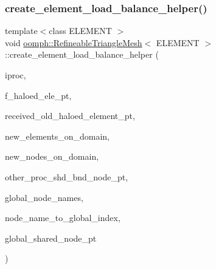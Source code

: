 \subsubsection{\texorpdfstring{create\+\_\+element\+\_\+load\+\_\+balance\+\_\+helper()}{create\_element\_load\_balance\_helper()}}
{\footnotesize\ttfamily template$<$class E\+L\+E\+M\+E\+NT $>$ \\
void \hyperlink{classoomph_1_1RefineableTriangleMesh}{oomph\+::\+Refineable\+Triangle\+Mesh}$<$ E\+L\+E\+M\+E\+NT $>$\+::create\+\_\+element\+\_\+load\+\_\+balance\+\_\+helper (\begin{DoxyParamCaption}\item[{unsigned \&}]{iproc,  }\item[{\hyperlink{classoomph_1_1Vector}{Vector}$<$ \hyperlink{classoomph_1_1Vector}{Vector}$<$ \hyperlink{classoomph_1_1FiniteElement}{Finite\+Element} $\ast$$>$ $>$ \&}]{f\+\_\+haloed\+\_\+ele\+\_\+pt,  }\item[{\hyperlink{classoomph_1_1Vector}{Vector}$<$ \hyperlink{classoomph_1_1Vector}{Vector}$<$ std\+::map$<$ unsigned, \hyperlink{classoomph_1_1FiniteElement}{Finite\+Element} $\ast$$>$ $>$ $>$ \&}]{received\+\_\+old\+\_\+haloed\+\_\+element\+\_\+pt,  }\item[{\hyperlink{classoomph_1_1Vector}{Vector}$<$ \hyperlink{classoomph_1_1FiniteElement}{Finite\+Element} $\ast$$>$ \&}]{new\+\_\+elements\+\_\+on\+\_\+domain,  }\item[{\hyperlink{classoomph_1_1Vector}{Vector}$<$ \hyperlink{classoomph_1_1Node}{Node} $\ast$$>$ \&}]{new\+\_\+nodes\+\_\+on\+\_\+domain,  }\item[{\hyperlink{classoomph_1_1Vector}{Vector}$<$ \hyperlink{classoomph_1_1Vector}{Vector}$<$ \hyperlink{classoomph_1_1Vector}{Vector}$<$ std\+::map$<$ unsigned, \hyperlink{classoomph_1_1Node}{Node} $\ast$$>$ $>$ $>$ $>$ \&}]{other\+\_\+proc\+\_\+shd\+\_\+bnd\+\_\+node\+\_\+pt,  }\item[{\hyperlink{classoomph_1_1Vector}{Vector}$<$ \hyperlink{classoomph_1_1Vector}{Vector}$<$ \hyperlink{classoomph_1_1Vector}{Vector}$<$ unsigned $>$ $>$ $>$ \&}]{global\+\_\+node\+\_\+names,  }\item[{std\+::map$<$ \hyperlink{classoomph_1_1Vector}{Vector}$<$ unsigned $>$, unsigned $>$ \&}]{node\+\_\+name\+\_\+to\+\_\+global\+\_\+index,  }\item[{\hyperlink{classoomph_1_1Vector}{Vector}$<$ \hyperlink{classoomph_1_1Node}{Node} $\ast$$>$ \&}]{global\+\_\+shared\+\_\+node\+\_\+pt }\end{DoxyParamCaption})\hspace{0.3cm}{\ttfamily [protected]}}



